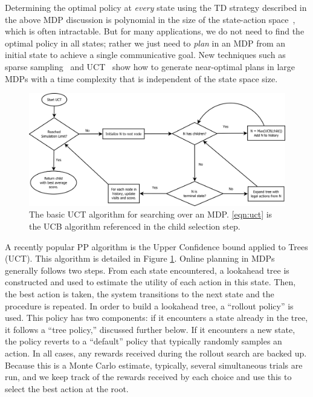 Determining the optimal policy at {\em every} state using the TD
strategy described in the above MDP discussion is polynomial in the size of the state-action
space~\cite{brafman_2003_rmax}, which is often intractable.
But for many applications, we do not
need to find the optimal policy in all states; rather we just need to {\em plan} in
an MDP from an initial state to achieve a single communicative goal. New techniques such
as sparse sampling~\cite{kearns_1999_sparse} and
UCT~\cite{kocsis_bandit_2006} show how to generate near-optimal plans
in large MDPs with a time complexity that is independent of the state
space size.

\begin{figure}
\centering
\includegraphics[width=\linewidth]{uct.png}
\caption{The basic UCT algorithm for searching over an MDP.  \ref{eqn:uct} is
the UCB algorithm referenced in the child selection step.}
\label{uct-diagram}
\end{figure}

A recently popular PP algorithm is the Upper Confidence bound applied to Trees (UCT)\cite{kocsis_bandit_2006}.
This algorithm is detailed in Figure \ref{uct-diagram}.
Online planning in MDPs generally follows two steps. From each state
encountered, a lookahead tree is constructed and used to estimate the
utility of each action in this state. Then, the best action is taken,
the system transitions to the next state and the procedure is
repeated. In order to build a lookahead tree, a ``rollout policy'' is
used. This policy has two components: if it encounters a state already
in the tree, it follows a ``tree policy,'' discussed further below. If
it encounters a new state, the policy reverts to a ``default'' policy
that typically randomly samples an action. In all cases, any rewards
received during the rollout search are backed up. Because this is a
Monte Carlo estimate, typically, several simultaneous trials are run,
and we keep track of the rewards received by each choice and
use this to select the best action at the root.

